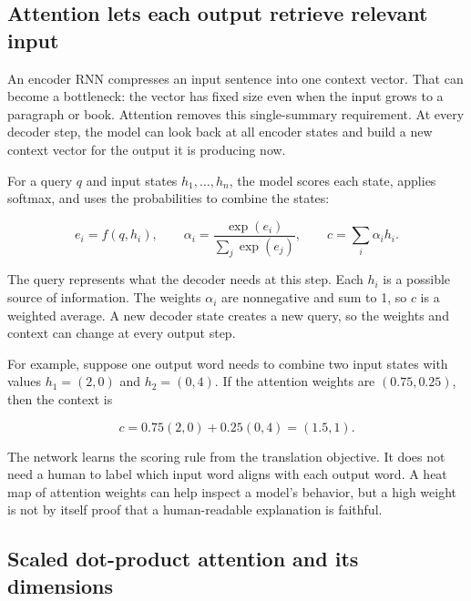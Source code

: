 \subsection{Attention lets each output retrieve relevant input}\label{04-visual-computing-ii-ch031-attention-lets-each-output-retrieve-relevant-input}

\hypertarget{04-visual-computing-ii-ch031-attention-lets-each-output-retrieve-relevant-input}{}

An encoder RNN compresses an input sentence into one context vector. That can become a bottleneck: the vector has fixed size even when the input grows to a paragraph or book. Attention removes this single-summary requirement. At every decoder step, the model can look back at all encoder states and build a new context vector for the output it is producing now.

For a query \(q\) and input states \(h_1,\ldots,h_n\), the model scores each state, applies softmax, and uses the probabilities to combine the states:

\[
e_i=f(q,h_i),\qquad
\alpha_i=\frac{\exp(e_i)}{\sum_j\exp(e_j)},\qquad
c=\sum_i\alpha_i h_i.
\]

The query represents what the decoder needs at this step. Each \(h_i\) is a possible source of information. The weights \(\alpha_i\) are nonnegative and sum to 1, so \(c\) is a weighted average. A new decoder state creates a new query, so the weights and context can change at every output step.

For example, suppose one output word needs to combine two input states with values \(h_1=(2,0)\) and \(h_2=(0,4)\). If the attention weights are \((0.75,0.25)\), then the context is

\[
c=0.75(2,0)+0.25(0,4)=(1.5,1).
\]

The network learns the scoring rule from the translation objective. It does not need a human to label which input word aligns with each output word. A heat map of attention weights can help inspect a model's behavior, but a high weight is not by itself proof that a human-readable explanation is faithful.

\subsection{Scaled dot-product attention and its dimensions}\label{04-visual-computing-ii-ch031-scaled-dot-product-attention-and-its-dimensions}

\hypertarget{04-visual-computing-ii-ch031-scaled-dot-product-attention-and-its-dimensions}{}

